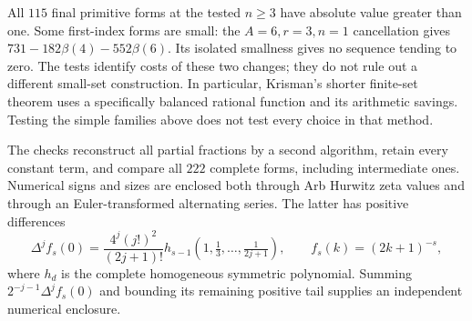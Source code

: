 All $115$ final primitive forms at the tested $n\ge3$ have absolute
value greater than one. Some first-index forms are small: the
$A=6,r=3,n=1$ cancellation gives
$731-182\beta(4)-552\beta(6)$. Its isolated smallness gives no
sequence tending to zero. The tests identify costs of these two
changes; they do not rule out a different small-set construction.
In particular, Krisman's shorter finite-set theorem uses a specifically
balanced rational function and its arithmetic savings. Testing the
simple families above does not test every choice in that method.

The checks reconstruct all partial fractions by a second algorithm,
retain every constant term, and compare all $222$ complete forms,
including intermediate ones. Numerical signs and sizes are enclosed
both through Arb Hurwitz zeta values and through an Euler-transformed
alternating series. The latter has positive differences
\[
 \Delta^jf_s(0)=\frac{4^j(j!)^2}{(2j+1)!}
 h_{s-1}\left(1,\tfrac13,\ldots,\tfrac1{2j+1}\right),
 \qquad f_s(k)=(2k+1)^{-s},
\]
where $h_d$ is the complete homogeneous symmetric polynomial.
Summing $2^{-j-1}\Delta^jf_s(0)$ and bounding its remaining positive
tail supplies an independent numerical enclosure.
